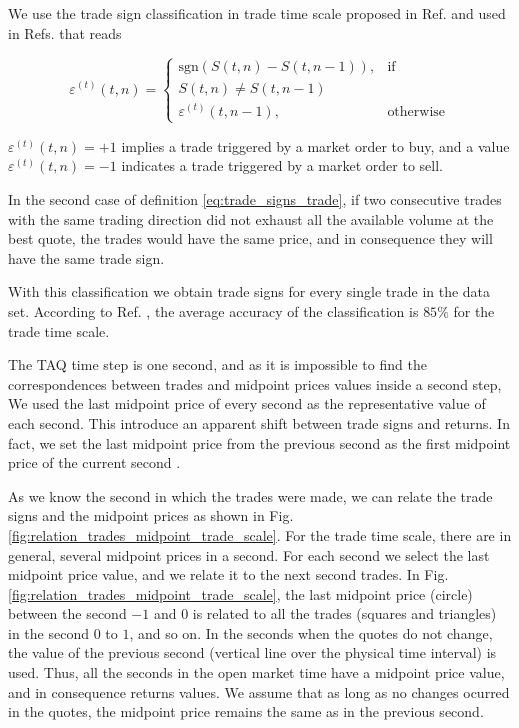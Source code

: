 We use the trade sign classification in trade time scale proposed in Ref.
\cite{Wang_2016_cross} and used in Refs.
\cite{Wang_2017,Wang_2018_copulas,Wang_2016_avg} that reads

\begin{equation}\label{eq:trade_signs_trade}
    \varepsilon^{\left(t\right)}\left(t,n\right)=\left\{
    \begin{array}{cc}
    \text{sgn}\left(S\left(t,n\right)-S\left(t,n-1\right)\right),
    & \text{if }\\ S\left(t,n\right) \ne S\left(t,n-1\right)\\
    \varepsilon^{\left(t\right)}\left(t,n-1\right),
    & \text{otherwise}
    \end{array}\right.
\end{equation}

$\varepsilon^{\left(t\right)}\left( t,n \right) = +1$ implies a trade triggered
by a market order to buy, and a value
$\varepsilon^{\left(t\right)}\left( t,n \right) = -1$ indicates a trade
triggered by a market order to sell.

In the second case of definition \ref{eq:trade_signs_trade}, if two consecutive
trades with the same trading direction did not exhaust all the available volume
at the best quote, the trades would have the same price, and in consequence
they will have the same trade sign.

With this classification we obtain trade signs for every single trade in the
data set. According to Ref. \cite{Wang_2016_cross}, the average accuracy of the
classification is $85\%$ for the trade time scale.

The TAQ time step is one second, and as it is impossible to find the
correspondences between trades and midpoint prices values inside a second step,
We used the last midpoint price of every second as the representative value of
each second. This introduce an apparent shift between trade signs and returns.
In fact, we set the last midpoint price from the previous second as the first
midpoint price of the current second \cite{Wang_2016_cross}.

As we know the second in which the trades were made, we can relate the trade
signs and the midpoint prices as shown in Fig.
\ref{fig:relation_trades_midpoint_trade_scale}. For the trade time scale, there
are in general, several midpoint prices in a second. For each second we select
the last midpoint price value, and we relate it to the next second trades. In
Fig. \ref{fig:relation_trades_midpoint_trade_scale}, the last midpoint price
(circle) between the second $-1$ and $0$ is related to all the trades (squares
and triangles) in the second $0$ to $1$, and so on. In the seconds when the
quotes do not change, the value of the previous second (vertical line over the
physical time interval) is used. Thus, all the seconds in the open market time
have a midpoint price value, and in consequence returns values. We assume that
as long as no changes ocurred in the quotes, the midpoint price remains the
same as in the previous second.


